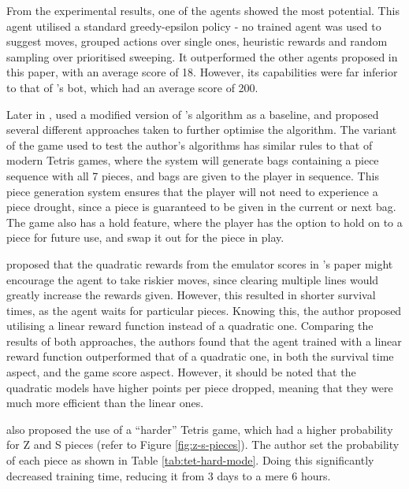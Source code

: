 \documentclass[a4paper, 12pt]{extreport}
\begin{document}
				From the experimental results, one of the agents showed the most potential. This agent utilised a standard greedy-epsilon policy - no trained agent was used to suggest moves, grouped actions over single ones, heuristic rewards and random sampling over prioritised sweeping. It outperformed the other agents proposed in this paper, with an average score of 18. However, its capabilities were far inferior to that of \citeauthor{lee-ai}'s bot, which had an average score of 200.
				
				Later in \citeyear{tetris-drl-2}, \citeauthor{tetris-drl-2} \cite{tetris-drl-2} used a modified version of \citeauthor{tetris-drl}'s algorithm as a baseline, and proposed several different approaches taken to further optimise the algorithm. The variant of the game used to test the author's algorithms has similar rules to that of modern Tetris games, where the system will generate bags containing a piece sequence with all 7 pieces, and bags are given to the player in sequence. This piece generation system ensures that the player will not need to experience a piece drought, since a piece is guaranteed to be given in the current or next bag. The game also has a hold feature, where the player has the option to hold on to a piece for future use, and swap it out for the piece in play.
				
				\citeauthor{tetris-drl-2} proposed that the quadratic rewards from the emulator scores in \citeauthor{tetris-drl}'s paper might encourage the agent to take riskier moves, since clearing multiple lines would greatly increase the rewards given. However, this resulted in shorter survival times, as the agent waits for particular pieces. Knowing this, the author proposed utilising a linear reward function instead of a quadratic one. Comparing the results of both approaches, the authors found that the agent trained with a linear reward function outperformed that of a quadratic one, in both the survival time aspect, and the game score aspect. However, it should be noted that the quadratic models have higher points per piece dropped, meaning that they were much more efficient than the linear ones.
				
				\citeauthor{tetris-drl-2} also proposed the use of a ``harder'' Tetris game, which had a higher probability for Z and S pieces (refer to Figure \ref{fig:z-s-pieces}). The author set the probability of each piece as shown in Table \ref{tab:tet-hard-mode}. Doing this significantly decreased training time, reducing it from 3 days to a mere 6 hours.
				
\end{document}
